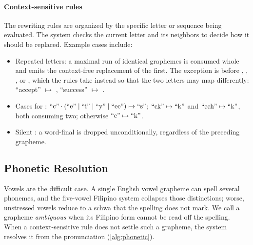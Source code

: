 \paragraph{Context-sensitive rules}

The rewriting rules are organized by the specific letter or sequence being
evaluated. The system checks the current letter and its neighbors to decide how
it should be replaced. Example cases include:

\begin{itemize}
      \item Repeated letters: a maximal run of identical graphemes is consumed whole and
            emits the context-free replacement of the first. The exception is 
            before , , , or , which the  rules take instead
            so that the two letters may map differently: ``accept'' $\mapsto$ ,
            ``success'' $\mapsto$ .
      \item Cases for : \(\gr{c}\cdot(\gr{e}\mid\gr{i}\mid\gr{y}\mid\gr{ee})
            \mapsto\gr{s}\); \(\gr{ck}\mapsto\gr{k}\) and \(\gr{cch}\mapsto\gr{k}\), both
            consuming two; otherwise \(\gr{c}\mapsto\gr{k}\).
      \item Silent : a word-final  is dropped unconditionally, regardless of
            the preceding grapheme.
\end{itemize}

\subsection{Phonetic Resolution}\label{subsec:phonetic_resolution}

Vowels are the difficult case. A single English vowel grapheme can spell
several phonemes, and the five-vowel Filipino system collapses those
distinctions; worse, unstressed vowels reduce to a schwa that the spelling does
not mark. We call a grapheme \emph{ambiguous} when its Filipino form cannot be
read off the spelling. When a context-sensitive rule does not settle such a
grapheme, the system resolves it from the pronunciation (\cref{alg:phonetic}).

